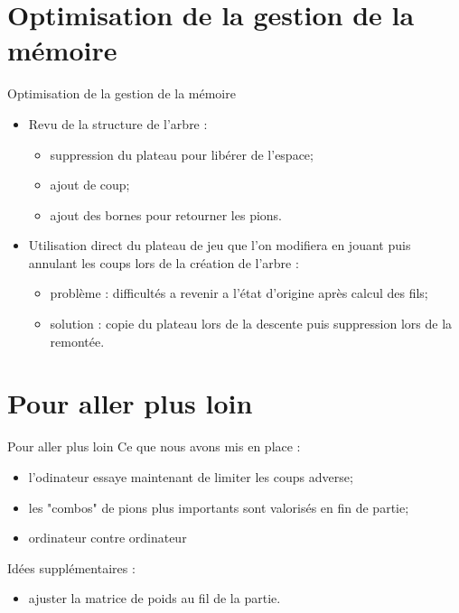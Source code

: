 \documentclass{beamer}
\begin{document}
\section{Optimisation de la gestion de la mémoire}
\begin{frame}{Optimisation de la gestion de la mémoire}

\begin{itemize}
    \item Revu de la structure de l'arbre :
    \begin{itemize}
        \item suppression du plateau pour libérer de l'espace;
        \item ajout de coup;
        \item ajout des bornes pour retourner les pions. 
    \end{itemize}
    \item Utilisation direct du plateau de jeu que l'on modifiera en jouant puis annulant les coups lors de la création de l'arbre :
    \begin{itemize}
        \item problème : difficultés a revenir a l'état d'origine après calcul des fils;
        \item solution : copie du plateau lors de la descente puis suppression lors de la remontée.
    \end{itemize}
\end{itemize}
    
\end{frame}

\section{Pour aller plus loin}
\begin{frame}{Pour aller plus loin}
    Ce que nous avons mis en place :
    \begin{itemize}
        \item l'odinateur essaye maintenant de limiter les coups adverse;
        \item les "combos" de pions plus importants sont valorisés en fin de partie;
        \item ordinateur contre ordinateur
    \end{itemize}

    Idées supplémentaires :
    \begin{itemize}
        \item ajuster la matrice de poids au fil de la partie.
    \end{itemize}
\end{frame}
\end{document}
